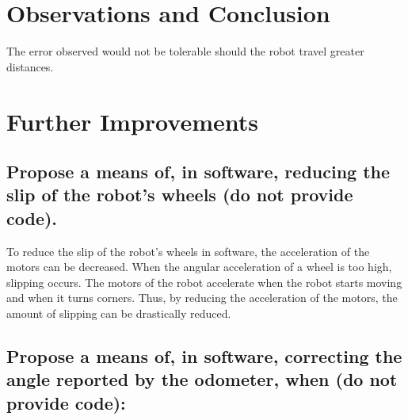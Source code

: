 \documentclass[11pt]{article} %
\begin{document}
\section{Observations and Conclusion}
The error observed would not be tolerable should the robot travel greater distances.
\section{Further Improvements}
\subsection{Propose a means of, in software, reducing the slip of the robot's wheels (do not provide code).}
To reduce the slip of the robot's wheels in software, the acceleration of the motors can be
decreased. When the angular acceleration of a wheel is too high, slipping occurs. The motors of the
robot accelerate when the robot starts moving and when it turns corners. Thus, by reducing
the acceleration of the motors, the amount of slipping can be drastically reduced.
\subsection{Propose a means of, in software, correcting the angle reported by the odometer, when (do not provide code):}
\end{document}
